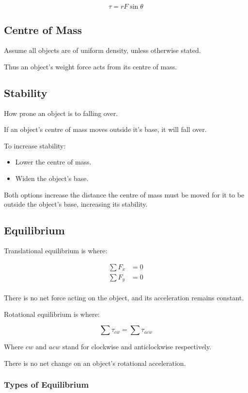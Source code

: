 \documentclass[a4paper,11pt]{report}
\begin{document}
$$
\tau = rF \sin{\theta}
$$

\subsection{Centre of Mass}

Assume all objects are of uniform density, unless otherwise stated.

Thus an object's weight force acts from its centre of mass.

\subsection{Stability}

How prone an object is to falling over.

If an object's centre of mass moves outside it's base, it will fall over.

To increase stability:

\begin{itemize}
\item Lower the centre of mass.
\item Widen the object's base.
\end{itemize}

Both options increase the distance the centre of mass must be moved for it to
be outside the object's base, increasing its stability.

\subsection{Equilibrium}

Translational equilibrium is where:

$$
\begin{aligned}
\sum F_x & = 0 \\
\sum F_y & = 0 \\
\end{aligned}
$$

There is no net force acting on the object, and its acceleration remains
constant.

Rotational equilibrium is where:

$$
\sum \tau_{cw} = \sum \tau_{acw}
$$

Where $cw$ and $acw$ stand for clockwise and anticlockwise respectively.

There is no net change on an object's rotational acceleration.

\subsubsection{Types of Equilibrium}
\end{document}
